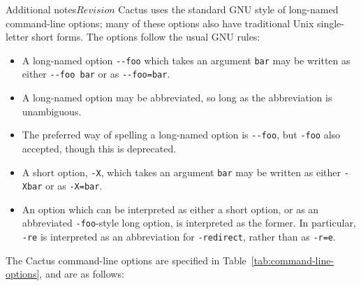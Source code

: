 \begin{cactuspart}{Additional notes}{}{$Revision$}
Cactus uses the standard GNU style of long-named command-line options;
many of these options also have traditional Unix single-letter short forms.
The options follow the usual GNU rules:
\begin{itemize}
\item	A long-named option \verb|--foo| which takes an argument \verb|bar|
	may be written as either \verb|--foo bar| or as \verb|--foo=bar|.
\item	A long-named option may be abbreviated, so long as the abbreviation
	is unambiguous.
\item	The preferred way of spelling a long-named option is \verb|--foo|,
	but \verb|-foo| also accepted, though this is deprecated.
\item	A short option, \verb|-X|, which takes an argument \verb|bar|
	may be written as either \verb|-Xbar| or as \verb|-X=bar|.
\item	An option which can be interpreted as either a short option,
	or as an abbreviated \verb|-foo|-style long option, is interpreted
	as the former.  In particular, \verb|-re| is interpreted as
	an abbreviation for \verb|-redirect|, rather than as \verb|-r=e|.
\end{itemize}

The Cactus command-line options are specified in
Table~\ref{tab:command-line-options}, and are as follows:


\end{cactuspart}
